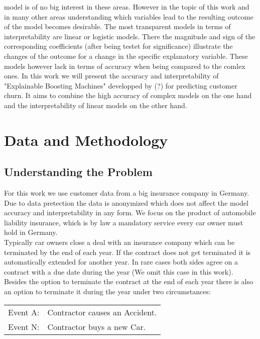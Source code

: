 \documentclass[12pt,titlepage]{article}
\begin{document}
model is of no big interest in these areas. However in the topic of this work and in many other areas understanding which
variables lead to the resulting outcome of the model becomes desirable. The most transparent models in terms of
interpretability are linear or logistic models. There the magnitude and sign of the corresponding coefficients (after being
testet for significance) illustrate the changes of the outcome for a change in the specific explanatory variable. These models
however lack in terms of accuracy when being compared to the comlex ones. In this work we will present the accuracy and
interpretability of "Explainable Boosting Machines" developped by (?) for predicting customer churn. It aims to combine the
high accuracy of complex models on the one hand and the interpretability of linear models on the other hand. \\

\section{Data and Methodology} \par

\subsection{Understanding the Problem} \par

For this work we use customer data from a big insurance company in Germany. Due to data pretection the data is anonymized which
does not affect the model accuracy and interpretability in any form. We focus on the product of automobile liability insurance,
which is by law a mandatory service every car owner must hold in Germany. \\
Typically car owners close a deal with an insurance company which can be terminated by the end of each year. If the contract
does not get terminated it is automatically extended for another year. In rare cases both sides agree on a contract with a due
date during the year (We omit this case in this work). Besides the option to terminate the contract at the end of each year
there is also an option to terminate it during the year under two circumstances:

\begin{center}
    \begin{tabular}{ll}
        Event A: & Contractor causes an Accident. \\
        Event N: & Contractor buys a new Car. \\
    \end{tabular}
\end{center}
\end{document}
